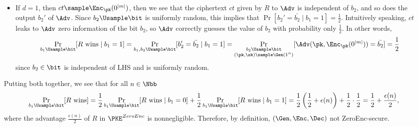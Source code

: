 \begin{answer}[i]
\begin{itemize}
        \item If $d=1$, then $ct\sample \Enc_\pk(0^{|m|})$, then we see that the ciphertext $ct$ given by $R$ to $\Adv$ is independent of $b_2$, and so does the output $b_2'$ of $\Adv$. Since $b_2\Usample\bit$ is uniformly random, this implies that $\Pr[b_2'=\bar{b_2}\mid b_1=1]=\frac{1}{2}$. Intuitively speaking, $ct$ leaks to $\Adv$ zero information of the bit $b_2$, so $\Adv$ correctly guesses the value of $b_2$ with probability only $\frac{1}{2}$. In other words,
        \[
            \Pr_{b_1\Usample\bit}[ R \textrm{ wins}\mid b_1=1]
            =\Pr_{b_1,b_2\Usample\bit}[ b_2'=\bar{b_2} \mid b_1=1]
            =\Pr_{\substack{b_2\Usample\bit\\(\pk, \sk)\sample \Gen(1^n)}}[ \Adv(\pk, \Enc_\pk(0^{|m|}))=\bar{b_2}]
            =\frac{1}{2}
        \]
        since $b_2\in\bit$ is independent of LHS and is uniformly random. 
    \end{itemize}
    Putting both together, we see that for all $n\in\Nbb$
    \[
        \Pr_{b_1\Usample\bit}[ R \textrm{ wins}]
        =\frac{1}{2}\Pr_{b_1\Usample\bit}[ R \textrm{ wins}\mid b_1=0]+\frac{1}{2}\Pr_{b_1\Usample\bit}[ R \textrm{ wins}\mid b_1=1]
        = \frac{1}{2}\left(\frac{1}{2}+\epsilon(n)\right)+\frac{1}{2}\cdot \frac{1}{2}
        = \frac{1}{2}+\frac{\epsilon(n)}{2},
    \]
    where the advantage $\frac{\epsilon(n)}{2}$ of $R$ in $\PKE^{ZeroEnc}$ is nonnegligible.
    Therefore, by definition, $(\Gen, \Enc, \Dec)$ not ZeroEnc-secure. 
\end{answer}









